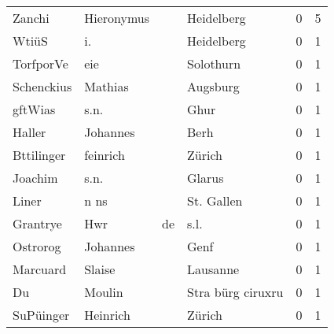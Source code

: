\begin{center}
\begin{tiny}
\begin{longtabu}{llllrr}
                   Zanchi &                         Hieronymus &             &                                  Heidelberg &          0 &         5 \\
                    WtiüS &                                 i. &             &                                  Heidelberg &          0 &         1 \\
                TorfporVe &                                eie &             &                                   Solothurn &          0 &         1 \\
               Schenckius &                            Mathias &             &                                    Augsburg &          0 &         1 \\
                  gftWias &                               s.n. &             &                                        Ghur &          0 &         1 \\
                   Haller &                           Johannes &             &                                        Berh &          0 &         1 \\
               Bttilinger &                           feinrich &             &                                      Zürich &          0 &         1 \\
                  Joachim &                               s.n. &             &                                      Glarus &          0 &         1 \\
                    Liner &                               n ns &             &                                  St. Gallen &          0 &         1 \\
                 Grantrye &                                Hwr &          de &                                        s.l. &          0 &         1 \\
                 Ostrorog &                           Johannes &             &                                        Genf &          0 &         1 \\
                 Marcuard &                             Slaise &             &                                    Lausanne &          0 &         1 \\
                       Du &                             Moulin &             &                           Stra bürg ciruxru &          0 &         1 \\
                SuPüinger &                           Heinrich &             &                                      Zürich &          0 &         1 \\

\end{longtabu}
\end{tiny}
\end{center}
